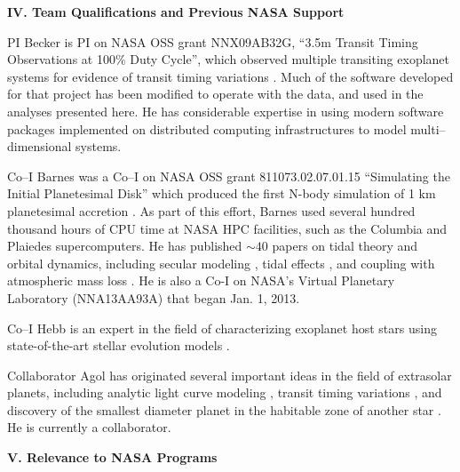 \bigskip
\centerline{\bf IV. Team Qualifications and Previous NASA Support}
\smallskip

PI Becker is PI on NASA OSS grant NNX09AB32G, ``3.5m Transit Timing
Observations at 100\% Duty Cycle'', which observed multiple transiting
exoplanet systems for evidence of transit timing variations
\citep{2011ApJ...731..123K, 2013ApJ...764....8K, 2013ApJ...764L..17B,
  2013arXiv1304.5713K}.  Much of the software developed for that
project has been modified to operate with the \kepler data, and used in
the analyses presented here.  He has considerable expertise in using
modern software packages implemented on distributed computing
infrastructures to model multi--dimensional systems.  


Co--I Barnes was a Co--I on NASA OSS grant 811073.02.07.01.15
``Simulating the Initial Planetesimal Disk'' which produced the first
N-body simulation of 1 km planetesimal accretion
\citep{Barnes09_1km}. As part of this effort, Barnes used several hundred thousand hours of CPU time at NASA HPC facilities, such as the Columbia and Plaiedes supercomputers. He has published $\sim 40$ papers on tidal theory and orbital dynamics, including secular modeling \citep{BarnesGreenberg06a}, tidal effects \citep{Barnes13}, and coupling with atmospheric mass loss \citep{Jackson10,Barnes13}. He is also a Co-I on NASA's Virtual Planetary Laboratory (NNA13AA93A) that began Jan. 1, 2013. 

Co--I Hebb is an expert in the field of characterizing exoplanet host
stars using state-of-the-art stellar evolution
models \citep[e.g.][]{Hebb2009,Hebb2010,Bouchy2010,Yilen2013}.

Collaborator Agol has originated several important ideas in the field of
extrasolar planets, including analytic light curve
modeling \citep{2002ApJ...580L.171M}, transit timing
variations \citep{2005MNRAS.359..567A}, and discovery of the smallest
diameter planet in the habitable zone of another
star \citep{2013arXiv1304.7387B}.  He is currently a \kepler
collaborator.


\bigskip
\centerline{\bf V. Relevance to NASA Programs}
\smallskip

